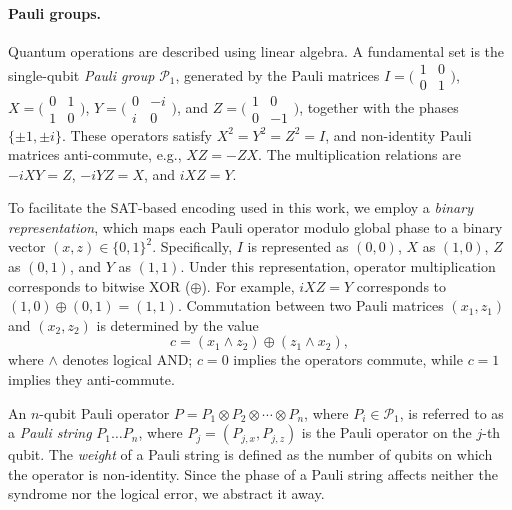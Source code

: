 \documentclass[acmsmallw,review]{acmart}
\newcommand{\cy}[1]{}
\begin{document}
\paragraph{\textbf{Pauli groups.}}
Quantum operations are described using linear algebra. A fundamental set is the single-qubit \emph{Pauli group} $\mathcal{P}_1$, generated by the Pauli matrices $I=\bigl( \begin{smallmatrix} 1 & 0 \\ 0 & 1 \end{smallmatrix} \bigr)$, $X=\bigl( \begin{smallmatrix} 0 & 1 \\ 1 & 0 \end{smallmatrix} \bigr)$, $Y=\bigl( \begin{smallmatrix} 0 & -i \\ i & 0 \end{smallmatrix} \bigr)$, and $Z=\bigl( \begin{smallmatrix} 1 & 0 \\ 0 & -1 \end{smallmatrix} \bigr)$, together with the phases $\{\pm 1,\pm i \}$. These operators satisfy $X^2=Y^2=Z^2=I$, and non-identity Pauli matrices anti-commute, e.g., $XZ = -ZX$.
The multiplication relations are $-iXY=Z$, $-iYZ=X$, and $iXZ=Y$.


To facilitate the SAT-based encoding used in this work, we employ a \emph{binary representation}, which maps each Pauli operator modulo global phase to a binary vector $(x,z) \in \{0,1\}^2$. Specifically, $I$ is represented as $(0,0)$, $X$ as $(1,0)$, $Z$ as $(0,1)$, and $Y$ as $(1,1)$. Under this representation, operator multiplication corresponds to bitwise XOR ($\oplus$). For example, $iXZ = Y$ corresponds to $(1,0) \oplus (0,1) = (1,1)$. Commutation between two Pauli matrices $(x_1,z_1)$ and $(x_2,z_2)$ is determined by the value 
\begin{equation}
c = (x_1 \land z_2) \oplus (z_1 \land x_2),
\end{equation}
where $\land$ denotes logical AND; $c=0$ implies the operators commute, while $c=1$ implies they anti-commute.

An $n$-qubit Pauli operator $P = P_1 \otimes P_2\otimes \cdots\otimes P_n$, where $P_i \in \mathcal{P}_1$, is referred to as a \emph{Pauli string} $P_1 \dots P_n$, where $P_j = (P_{j,x}, P_{j,z})$ is the Pauli operator on the $j$-th qubit. The \emph{weight} of a Pauli string is defined as the number of qubits on which the operator is non-identity. Since the phase of a Pauli string affects neither the syndrome nor the logical error, we abstract it away.
\end{document}
